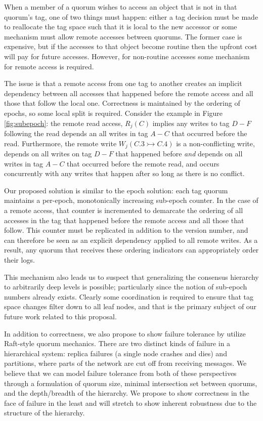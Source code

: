 \documentclass{article}
\begin{document}
When a member of a quorum wishes to access an object that is not in that quorum's tag, one of two things must happen: either a tag decision must be made to reallocate the tag space such that it is local to the new accessor or some mechanism must allow remote accesses between quorums. The former case is expensive, but if the accesses to that object become routine then the upfront cost will pay for future accesses. However, for non-routine accesses some mechanism for remote access is required.

The issue is that a remote access from one tag to another creates an implicit dependency between all accesses that happened before the remote access and all those that follow the local one. Correctness is maintained by the ordering of epochs, so some local split is required. Consider the example in Figure \ref{fig:subepoch}: the remote read access, $R_j(C)$ implies any writes to tag $D-F$ following the read depends an all writes in tag $A-C$ that occurred before the read. Furthermore, the remote write $W_j(C.3 \rightarrowtail C.4)$ is a non-conflicting write, depends on all writes on tag $D-F$ that happened before \textit{and} depends on all writes in tag $A-C$ that occurred before the remote read, and occurs concurrently with any writes that happen after so long as there is no conflict.

Our proposed solution is similar to the epoch solution: each tag quorum maintains a per-epoch, monotonically increasing sub-epoch counter. In the case of a remote access, that counter is incremented to demarcate the ordering of all accesses in the tag that happened before the remote access and all those that follow. This counter must be replicated in addition to the version number, and can therefore be seen as an explicit dependency applied to all remote writes. As a result, any quorum that receives these ordering indicators can appropriately order their logs.

This mechanism also leads us to suspect that generalizing the consensus hierarchy to arbitrarily deep levels is possible; particularly since the notion of sub-epoch numbers already exists. Clearly some coordination is required to ensure that tag space changes filter down to all leaf nodes, and that is the primary subject of our future work related to this proposal.

In addition to correctness, we also propose to show failure tolerance by utilize Raft-style quorum mechanics. There are two distinct kinds of failure in a hierarchical system: replica failures (a single node crashes and dies) and partitions, where parts of the network are cut off from receiving messages. We believe that we can model failure tolerance from both of these perspectives through a formulation of quorum size, minimal intersection set between quorums, and the depth/breadth of the hierarchy. We propose to show correctness in the face of failure in the least and will stretch to show inherent robustness due to the structure of the hierarchy.
\end{document}
